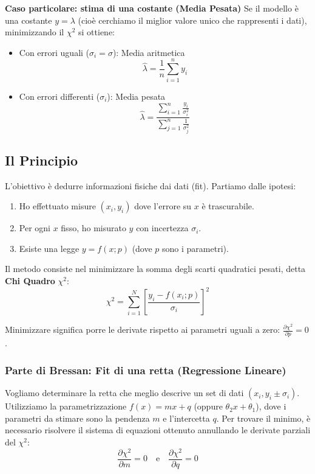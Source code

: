 \documentclass{article}
\theoremstyle{remark}
\newcommand{\ripasso}[1]{
    \subsubsection{\texorpdfstring{\color{red}Parte di Bressan: #1}{Parte di Bressan: #1}}
}
\begin{document}
\textbf{Caso particolare: stima di una costante (Media Pesata)}
Se il modello è una costante $y = \lambda$ (cioè cerchiamo il miglior valore unico che rappresenti i dati), minimizzando il $\chi^2$ si ottiene:
\begin{itemize}
    \item Con errori uguali ($\sigma_i = \sigma$): Media aritmetica
    \[ \hat{\lambda} = \frac{1}{n} \sum_{i=1}^n y_i \]
    \item Con errori differenti ($\sigma_i$): Media pesata
    \[ \hat{\lambda} = \frac{\sum_{i=1}^n \frac{y_i}{\sigma_i^2}}{\sum_{j=1}^{n}\frac{1}{\sigma_j^2}} \]
\end{itemize}

\subsection{Il Principio}

L'obiettivo è dedurre informazioni fisiche dai dati (fit). Partiamo dalle ipotesi:
\begin{enumerate}
    \item Ho effettuato misure $(x_i, y_i)$ dove l'errore su $x$ è trascurabile.
    \item Per ogni $x$ fisso, ho misurato $y$ con incertezza $\sigma_i$.
    \item Esiste una legge $y = f(x; p)$ (dove $p$ sono i parametri).
\end{enumerate}

Il metodo consiste nel minimizzare la somma degli scarti quadratici pesati, detta \textbf{Chi Quadro} $\chi^2$:
\begin{equation}
    \chi^2 = \sum_{i=1}^{N} \left[ \frac{y_i - f(x_i; p)}{\sigma_i} \right]^2
\end{equation}

Minimizzare significa porre le derivate rispetto ai parametri uguali a zero: $\frac{\partial \chi^2}{\partial p} = 0$.
\ripasso{Fit di una retta (Regressione Lineare)}

Vogliamo determinare la retta che meglio descrive un set di dati $(x_i, y_i \pm \sigma_i)$.
Utilizziamo la parametrizzazione $f(x) = mx + q$ (oppure $\theta_2 x + \theta_1$), dove i parametri da stimare sono la pendenza $m$ e l'intercetta $q$.
Per trovare il minimo, è necessario risolvere il sistema di equazioni ottenuto annullando le derivate parziali del $\chi^2$:
\[ \frac{\partial \chi^2}{\partial m}=0 \quad \text{e} \quad \frac{\partial \chi^2}{\partial q}=0 \]
\end{document}
